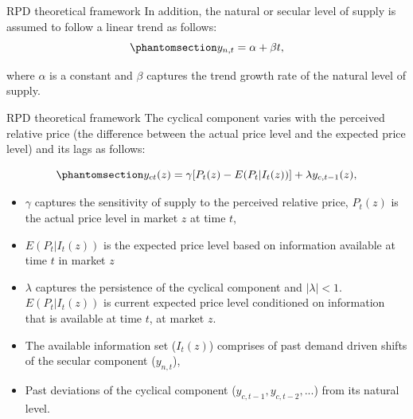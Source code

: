 \documentclass[
  ignorenonframetext,
]{beamer}
\providecommand{\tightlist}{%
  \setlength{\itemsep}{0pt}\setlength{\parskip}{0pt}}\usepackage{longtable,booktabs,array}
\begin{document}
\begin{frame}{RPD theoretical framework}
\label{rpd-theoretical-framework-5}
In addition, the natural or secular level of supply is assumed to follow
a linear trend as follows:
\begin{equation}\phantomsection\label{eq-natural_supply}{ y_{n,t} = \alpha + \beta t, }\end{equation}

where \(\alpha\) is a constant and \(\beta\) captures the trend growth
rate of the natural level of supply.
\end{frame}

\begin{frame}{RPD theoretical framework}
\label{rpd-theoretical-framework-6}
The cyclical component varies with the perceived relative price (the
difference between the actual price level and the expected price level)
and its lags as follows:

\begin{equation}\phantomsection\label{eq-cyclical_component}{ y_{ct}(z) = \gamma[P_t(z) - E(P_t | I_t(z))] + \lambda y_{c, t-1}(z), }\end{equation}

\begin{itemize}
\tightlist
\item
  \(\gamma\) captures the sensitivity of supply to the perceived
  relative price, \(P_t(z)\) is the actual price level in market \(z\)
  at time \(t\),
\item
  \(E(P_t | I_t(z))\) is the expected price level based on information
  available at time \(t\) in market \(z\)
\item
  \(\lambda\) captures the persistence of the cyclical component and
  \(|\lambda| < 1\). \(E(P_t | I_t(z))\) is current expected price level
  conditioned on information that is available at time \(t\), at market
  \(z\).
\item
  The available information set (\(I_t(z)\)) comprises of past demand
  driven shifts of the secular component (\(y_{n,t}\)),
\item
  Past deviations of the cyclical component
  (\(y_{c, t-1}, y_{c, t-2}, ...\)) from its natural level.
\end{itemize}
\end{frame}
\end{document}
